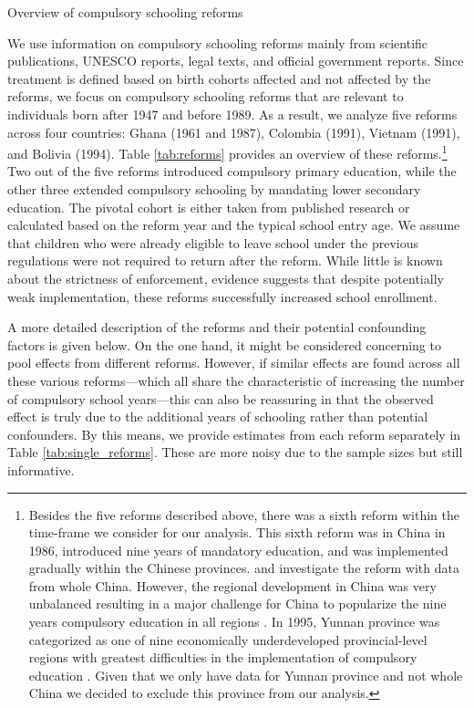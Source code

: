 \begin{table}[htbp]
	\caption{Overview of compulsory schooling reforms}
	\label{tab:reforms}
	\small
	\centering
	
\end{table}

We use information on compulsory schooling reforms mainly from scientific publications, UNESCO reports, legal texts, and official government reports. Since treatment is defined based on birth cohorts affected and not affected by the reforms, we focus on compulsory schooling reforms that are relevant to individuals born after 1947 and before 1989. As a result, we analyze five reforms across four countries: Ghana (1961 and 1987), Colombia (1991), Vietnam (1991), and Bolivia (1994). Table \ref{tab:reforms} provides an overview of these reforms.\footnote{
	Besides the five reforms described above, there was a sixth reform within the time-frame we consider for our analysis. This sixth reform was in China in 1986, introduced nine years of mandatory education, and was implemented gradually within the Chinese provinces. \citet{jiang_education_2020} and \citet{huang_understanding_2015} investigate the reform with data from whole China. However, the regional development in China was very unbalanced resulting in a major challenge for China to popularize the nine years compulsory education in all regions \parencite{wang_schooling_2020}. In 1995, Yunnan province was categorized as one of nine economically underdeveloped provincial-level regions with greatest difficulties in the implementation of compulsory education \parencite{wang_schooling_2020}. Given that we only have data for Yunnan province and not whole China we decided to exclude this province from our analysis.
} Two out of the five reforms introduced compulsory primary education, while the other three extended compulsory schooling by mandating lower secondary education. The pivotal cohort is either taken from published research or calculated based on the reform year and the typical school entry age. We assume that children who were already eligible to leave school under the previous regulations were not required to return after the reform. While little is known about the strictness of enforcement, evidence suggests that despite potentially weak implementation, these reforms successfully increased school enrollment.

A more detailed description of the reforms and their potential confounding factors is given below. On the one hand, it might be considered concerning to pool effects from different reforms. However, if similar effects are found across all these various reforms---which all share the characteristic of increasing the number of compulsory school years---this can also be reassuring in that the observed effect is truly due to the additional years of schooling rather than potential confounders. By this means, we provide estimates from each reform separately in Table \ref{tab:single_reforms}. These are more noisy due to the sample sizes but still informative.

